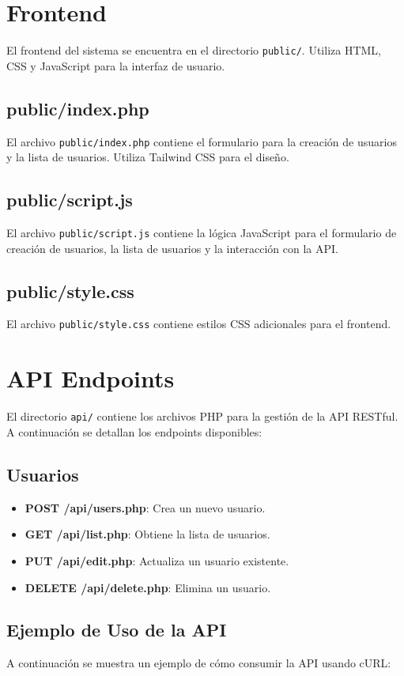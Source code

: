 \documentclass{article}
\begin{document}
\section{Frontend}
El frontend del sistema se encuentra en el directorio \texttt{public/}. Utiliza HTML, CSS y JavaScript para la interfaz de usuario.

\subsection{public/index.php}
El archivo \texttt{public/index.php} contiene el formulario para la creación de usuarios y la lista de usuarios. Utiliza Tailwind CSS para el diseño.

\subsection{public/script.js}
El archivo \texttt{public/script.js} contiene la lógica JavaScript para el formulario de creación de usuarios, la lista de usuarios y la interacción con la API.

\subsection{public/style.css}
El archivo \texttt{public/style.css} contiene estilos CSS adicionales para el frontend.

\section{API Endpoints}
El directorio \texttt{api/} contiene los archivos PHP para la gestión de la API RESTful. A continuación se detallan los endpoints disponibles:

\subsection{Usuarios}
\begin{itemize}
    \item \textbf{POST /api/users.php}: Crea un nuevo usuario.
    \item \textbf{GET /api/list.php}: Obtiene la lista de usuarios.
    \item \textbf{PUT /api/edit.php}: Actualiza un usuario existente.
    \item \textbf{DELETE /api/delete.php}: Elimina un usuario.
\end{itemize}

\subsection{Ejemplo de Uso de la API}
A continuación se muestra un ejemplo de cómo consumir la API usando cURL:
\end{document}
